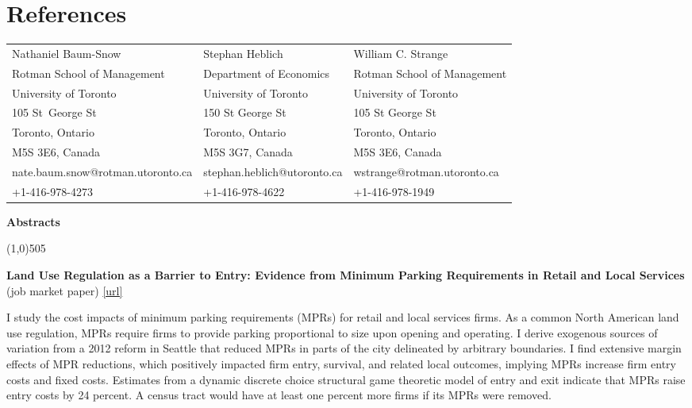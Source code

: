 \documentclass[11pt, a4paper]{article}
\begin{document}
{\section*{References}
\noindent\begin{tabular}{@{}lll}
Nathaniel Baum-Snow                 &  Stephan Heblich & William C. Strange           \\
Rotman School of Management   &  Department of Economics & Rotman School of Management  \\
University of Toronto     &  University of Toronto  & University of Toronto  \\
105 St\ George St        & 150 St George St & 105 St George St       \\
Toronto, Ontario          & Toronto, Ontario  & Toronto, Ontario        \\
 M5S 3E6, Canada           & M5S 3G7, Canada  & M5S 3E6, Canada          \\
nate.baum.snow@rotman.utoronto.ca      & stephan.heblich@utoronto.ca & wstrange@rotman.utoronto.ca\\
+1-416-978-4273           & +1-416-978-4622   & +1-416-978-1949        \\\end{tabular}

\newpage
\begin{center}
\LARGE
\textbf{Abstracts}
\normalsize
\end{center}
\line(1,0){505}

\begin{center}
\LARGE
\textbf{Land Use Regulation as a Barrier to Entry: Evidence from Minimum Parking Requirements in Retail and Local Services}\\
\large
(job market paper) \href{https://www.dropbox.com/scl/fi/6s49411cit1tgsrnsmwhh/YangJunhui_JobMarketPaper_202411.pdf?rlkey=od6mfnloa6fo6zvjmzc3e7etu&st=eo4ixm4y&dl=0}{[url]}
\normalsize
\end{center}

I study the cost impacts of minimum parking requirements (MPRs) for retail and local services firms. As a common North American land use regulation, MPRs require firms to provide parking proportional to size upon opening and operating. I derive exogenous sources of variation from a 2012 reform in Seattle that reduced MPRs in parts of the city delineated by arbitrary boundaries. I find extensive margin effects of MPR reductions, which positively impacted firm entry, survival, and related local outcomes, implying MPRs increase firm entry costs and fixed costs. Estimates from a dynamic discrete choice structural game theoretic model of entry and exit indicate that MPRs raise entry costs by 24 percent. A census tract would have at least one percent more firms if its MPRs were removed. \\

}
\end{document}
